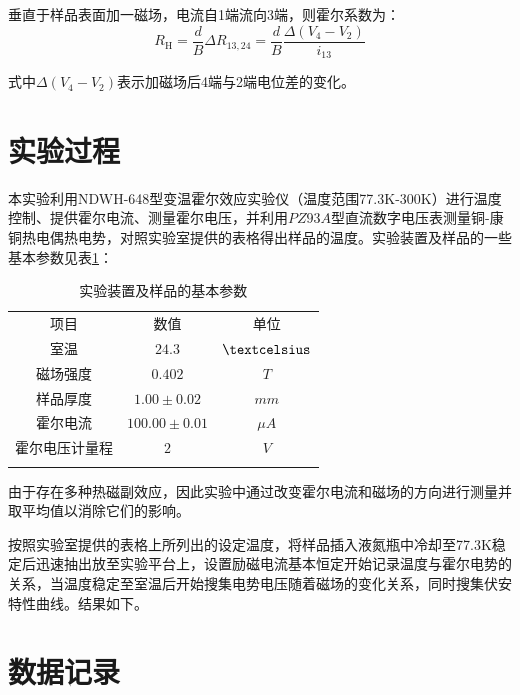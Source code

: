 \documentclass{buaaemp}
\begin{document}
	垂直于样品表面加一磁场，电流自1端流向3端，则霍尔系数为：
	\begin{equation}
		R_{\mathrm{H}}=\frac{d}{B} \Delta R_{13,24}=\frac{d}{B} \frac{\Delta\left(V_{4}-V_{2}\right)}{i_{13}}
	\end{equation}

	式中$\Delta\left(V_{4}-V_{2}\right)$表示加磁场后4端与2端电位差的变化。

 
	\section{实验过程}
	本实验利用NDWH-648型变温霍尔效应实验仪（温度范围77.3K-300K）进行温度控制、提供霍尔电流、测量霍尔电压，并利用$PZ93A$型直流数字电压表测量铜-康铜热电偶热电势，对照实验室提供的表格得出样品的温度。实验装置及样品的一些基本参数见表\ref{apparatus}：
	\begin{table}[htbp]
		\centering
		\begin{tabular}{ccc}%
			\hline\hline\noalign{\smallskip}
			项目 & 数值 & 单位  \\
			\noalign{\smallskip}\hline\noalign{\smallskip}
			室温 & $24.3$ & $\textcelsius$ \\
			磁场强度 & $0.402$ & $T$ \\
			样品厚度 & $1.00\pm0.02$ & $mm$ \\
			霍尔电流 & $100.00\pm0.01$ & $\mu A$ \\
			霍尔电压计量程 & $2$ & $V$ \\
			\noalign{\smallskip}\hline\hline
		\end{tabular}
		\caption{实验装置及样品的基本参数}
		\label{apparatus}
	\end{table}
	
	由于存在多种热磁副效应，因此实验中通过改变霍尔电流和磁场的方向进行测量并取平均值以消除它们的影响。
	
	按照实验室提供的表格上所列出的设定温度，将样品插入液氮瓶中冷却至77.3K稳定后迅速抽出放至实验平台上，设置励磁电流基本恒定开始记录温度与霍尔电势的关系，当温度稳定至室温后开始搜集电势电压随着磁场的变化关系，同时搜集伏安特性曲线。结果如下。
\section{数据记录}
\end{document}
